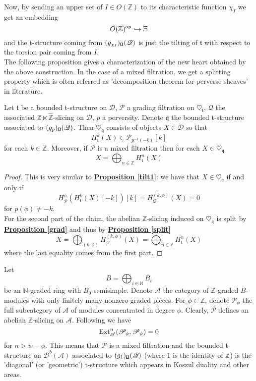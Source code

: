 Now, by sending an upper set of $I \in O(\mathbb{Z})$ to its characteristic function $\chi_I$ we get an embedding $$O(\mathbb{Z})^{\textnormal{op}} \hookrightarrow \Xi$$ and the t-structure coming from $(g_{\chi_I})_{\textnormal{\Libra}}(\mathscr{Q})$ is just the tilting of $\mathfrak{t}$ with respect to the torsion pair coming from $I$. \\
The following proposition gives a characterization of the new heart obtained by the above construction. In the case of a mixed filtration, we get a splitting property which is often referred as 'decomposition theorem for perverse sheaves' in literature. \\

\begin{prop}
Let $\mathfrak{t}$ be a bounded t-structure on $\mathscr{D}$, $\mathscr{P}$ a grading filtration on $\heartsuit_{\mathfrak{t}}$, $\mathscr{Q}$ the associated $\mathbb{Z} \ltimes \hat{\mathbb{Z}}$-slicing on $\mathscr{D}$, $p$ a perversity. Denote $\mathfrak{q}$ the bounded t-structure associated to $(g_p)_{\textnormal{\Libra}}(\mathscr{Q})$. Then $\heartsuit_{\mathfrak{q}}$ consists of objects $X \in \mathscr{D}$ so that $$H_{\mathfrak{t}}^{k}(X) \in \mathscr{P}_{p^{-1}(-k)}[k]$$ 
for each $k \in \mathbb{Z}$. Moreover, if $\mathscr{P}$ is a mixed filtration then for each $X \in \heartsuit_{\mathfrak{q}}$ $$X=\bigoplus_{n \in \mathbb{Z}}H_{\mathfrak{t}}^{n}(X)$$ 
\end{prop}

\begin{proof}
This is very similar to \hyperref[tilt1]{\textbf{Proposition \ref*{tilt1}}}: we have that $X \in \heartsuit_{\mathfrak{q}}$ if and only if $$H_{\mathscr{P}}^{\phi}(H_{\mathfrak{t}}^k(X)[-k])[k]=H_{\mathscr{Q}}^{(k,\phi)}(X)=0$$ 
for $p(\phi) \not = -k$. \\
For the second part of the claim, the abelian $\mathbb{Z}$-slicing induced on $\heartsuit_{\mathfrak{q}}$ is split by \hyperref[grad]{\textbf{Proposition \ref*{grad}}} and thus by \hyperref[split]{\textbf{Proposition \ref*{split}}} $$X=\bigoplus_{(k,\phi)}H_{\mathscr{Q}}^{(k,\phi)}(X)=\bigoplus_{n \in \mathbb{Z}}H_{\mathfrak{t}}^{n}(X)$$
where the last equality comes from the first part. 
\end{proof}

\begin{exmp}
Let $$B=\bigoplus_{i\in \mathbb{N}}B_i$$ be an $\mathbb{N}$-graded ring with $B_0$ semisimple. Denote $\mathscr{A}$ the category of $\mathbb{Z}$-graded $B$-modules with only finitely many nonzero graded pieces. For $\phi \in \mathbb{Z}$, denote $\mathscr{P}_{\phi}$ the full subcategory of $\mathscr{A}$ of modules concentrated in degree $\phi$. Clearly, $\mathscr{P}$ defines an abelian $\mathbb{Z}$-slicing on $\mathscr{A}$. Following \cite{kos} we have $$\textnormal{Ext}_{\mathscr{A}}^n(\mathscr{P}_{\phi},\mathscr{P}_{\psi})=0$$
for $n>\psi - \phi$. This means that $\mathscr{P}$ is a mixed filtration and the bounded t-structure on $\mathscr{D}^b(\mathscr{A})$ associated to $(g_1)_{\textnormal{\Libra}}(\mathscr{Q})$ (where $1$ is the identity of $\mathbb{Z}$) is the 'diagonal' (or 'geometric') t-structure which appears in Koszul duality and other areas. 
\end{exmp}

